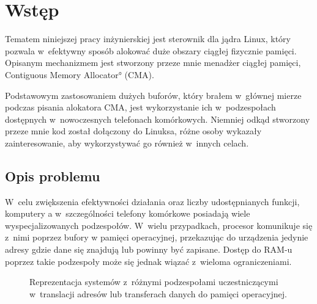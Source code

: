\chapter{Wstęp}

Tematem niniejszej pracy inżynierskiej jest sterownik dla jądra Linux,
który pozwala w~efektywny sposób alokować duże obszary ciągłej
fizycznie pamięci.  Opisanym mechanizmem jest stworzony przeze mnie
menadżer ciągłej pamięci, \ang*{Contiguous Memory Allocator} (CMA).

Podstawowym zastosowaniem dużych buforów, który brałem w~głównej
mierze podczas pisania alokatora CMA, jest wykorzystanie ich
w~podzespołach dostępnych w~nowoczesnych telefonach komórkowych.
Niemniej odkąd stworzony przeze mnie kod został dołączony do Linuksa,
różne osoby wykazały zainteresowanie, aby wykorzystywać go również
w~innych celach.


\section{Opis problemu}

W~celu zwiększenia efektywności działania oraz liczby udostępnianych
funkcji, komputery a w~szczególności telefony komórkowe posiadają
wiele wyspecjalizowanych podzespołów.  W~wielu przypadkach, procesor
komunikuje się z~nimi poprzez bufory w pamięci operacyjnej,
przekazując do urządzenia jedynie adresy gdzie dane się znajdują lub
powinny być zapisane.  Dostęp do RAM-u poprzez takie podzespoły może
się jednak wiązać z~wieloma ograniczeniami.

\begin{figure}[tbp]
  \centering
   \qquad
  \qquad
  \caption[Różne przestrzenie adresowe dostępne
    w~komputerze.]{Reprezentacja systemów z~różnymi podzespołami
    uczestniczącymi w~translacji adresów lub transferach danych do
    pamięci operacyjnej.}
  \label{fig:mmu-iommu}
\end{figure}

